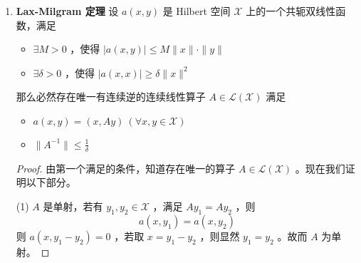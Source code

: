 \begin{enumerate}[leftmargin=2cm, label=\arabic*]
\begin{proof}
			充分性：假定 $\|A_n\|\leqslant C$ ，对 $\forall x\in\mathscr{X}$ 以及 $\forall \varepsilon > 0$ ，取 $y\in M$ 使得 
			\begin{equation*}
				\|x-y\| \leqslant \eqnmarkbox[blue]{a}{\frac{\varepsilon}{4(\|A\| + C)}}
			\end{equation*}
			
			便有
			\begin{equation*}
				\|A_n x - A x\| \leqslant \eqnmarkbox[red]{a1}{\|A_n x - A_n y\|} + \|A_n y - A y \| + \eqnmarkbox[red]{a2}{\|Ax - Ay\|} < \frac{\varepsilon}{2} + \|A_n y - A y\|
			\end{equation*}
			
			再取 $N$ 足够大，使得 $\|A_n y - Ay\|<\frac{\varepsilon}{2}$ ，即证。
		\end{proof}
		\item  \textbf{Lax-Milgram 定理} 设 $a(x,y)$ 是 Hilbert 空间 $\mathscr{X}$ 上的一个共轭双线性函数，满足
		\begin{itemize}
			\item $\exists M>0$ ，使得 $|a(x,y)|\leqslant M\|x\|\cdot\|y\|$ 
			\item $\exists \delta > 0$ ，使得 $|a(x,x)|\geqslant \delta\|x\|^2$ 
		\end{itemize}
		那么必然存在唯一有连续逆的连续线性算子 $A\in\mathscr{L}(\mathscr{X})$ 满足
		\begin{itemize}
			\item $a(x,y) = (x, Ay)\ (\forall x,y\in\mathscr{X})$ 
			\item $\|A^{-1}\| \leqslant \frac{1}{\delta}$ 
		\end{itemize}
		\begin{proof}
			由第一个满足的条件，知道存在唯一的算子 $A\in\mathscr{L}(\mathscr{X})$ 。现在我们证明以下部分。
			
			(1) $A$ 是单射，若有 $y_1, y_2\in\mathscr{X}$ ，满足 $Ay_1 = Ay_2$ ，则
			\begin{equation*}
				a(x,y_1) = a(x,y_2)
			\end{equation*}
			则 $a(x, y_1 - y_2) = 0$ ，若取 $x = y_1 - y_2$ ，则显然 $y_1 = y_2$ 。故而 $A$ 为单射。
			

\end{proof}
\end{enumerate}
